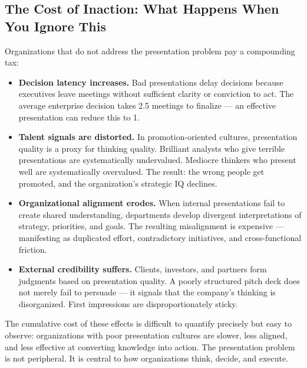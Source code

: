 \subsection{The Cost of Inaction: What Happens When You Ignore This}

Organizations that do not address the presentation problem pay a compounding tax:

\begin{itemize}
  \item \textbf{Decision latency increases.} Bad presentations delay decisions because executives leave meetings without sufficient clarity or conviction to act. The average enterprise decision takes 2.5 meetings to finalize --- an effective presentation can reduce this to 1.
  \item \textbf{Talent signals are distorted.} In promotion-oriented cultures, presentation quality is a proxy for thinking quality. Brilliant analysts who give terrible presentations are systematically undervalued. Mediocre thinkers who present well are systematically overvalued. The result: the wrong people get promoted, and the organization's strategic IQ declines.
  \item \textbf{Organizational alignment erodes.} When internal presentations fail to create shared understanding, departments develop divergent interpretations of strategy, priorities, and goals. The resulting misalignment is expensive --- manifesting as duplicated effort, contradictory initiatives, and cross-functional friction.
  \item \textbf{External credibility suffers.} Clients, investors, and partners form judgments based on presentation quality. A poorly structured pitch deck does not merely fail to persuade --- it signals that the company's thinking is disorganized. First impressions are disproportionately sticky.
\end{itemize}

The cumulative cost of these effects is difficult to quantify precisely but easy to observe: organizations with poor presentation cultures are slower, less aligned, and less effective at converting knowledge into action. The presentation problem is not peripheral. It is central to how organizations think, decide, and execute.

